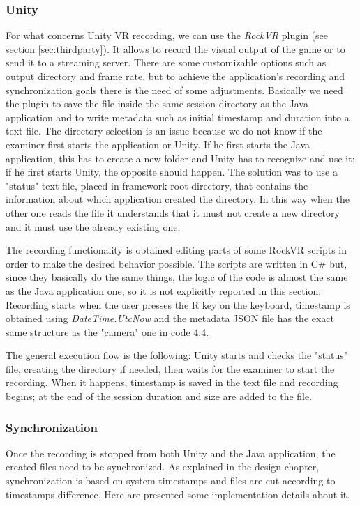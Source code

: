 \documentclass[binding=0.6cm,LaM]{sapthesis}
\begin{document}
\subsubsection{Unity}
For what concerns Unity VR recording, we can use the \textit{RockVR} plugin (see section \ref{sec:thirdparty}). It allows to record the visual output of the game or to send it to a streaming server. There are some customizable options such as output directory and frame rate, but to achieve the application's recording and synchronization goals there is the need of some adjustments. Basically we need the plugin to save the file inside the same session directory as the Java application and to write metadata such as initial timestamp and duration into a text file. The directory selection is an issue because we do not know if the examiner first starts the application or Unity. If he first starts the Java application, this has to create a new folder and Unity has to recognize and use it; if he first starts Unity, the opposite should happen. The solution was to use a "status" text file, placed in framework root directory, that contains the information about which application created the directory. In this way when the other one reads the file it understands that it must not create a new directory and it must use the already existing one. 

The recording functionality is obtained editing parts of some RockVR scripts in order to make the desired behavior possible. 
The scripts are written in C\# but, since they basically do the same things, the logic of the code is almost the same as the Java application one, so it is not explicitly reported in this section. Recording starts when the user presses the R key on the keyboard, timestamp is obtained using \textit{DateTime.UtcNow} and the metadata JSON file has the exact same structure as the "camera" one in code 4.4.

The general execution flow is the following: Unity starts and checks the "status" file, creating the directory if needed, then waits for the examiner to start the recording. When it happens, timestamp is saved in the text file and recording begins; at the end of the session duration and size are added to the file.

\subsubsection{Synchronization}
\label{sec:syncrealization}
Once the recording is stopped from both Unity and the Java application, the created files need to be synchronized. As explained in the design chapter, synchronization is based on system timestamps and files are cut according to timestamps difference. Here are presented some implementation details about it.
\end{document}

